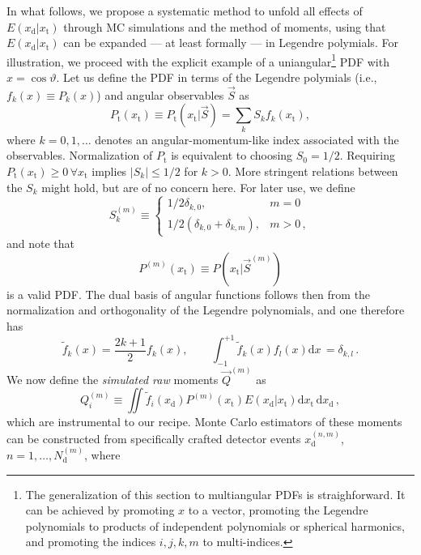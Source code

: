 \documentclass[aps,prd,reprint,nofootinbib,preprintnumbers]{revtex4}
\newcommand{\rmdx}[1]{\mbox{d} #1 \,} %
\newcommand{\subd}{_{\text{d}}}
\newcommand{\subt}{_{\text{t}}}
\renewcommand{\theta}{\vartheta}
\newcommand{\xd}{x\subd}
\newcommand{\xt}{x\subt}
\newcommand{\Ekernel}{E(\xd|\xt)}
\begin{document}
In what follows, we propose a systematic method to unfold all effects
of $\Ekernel$ through MC simulations and the method of moments,
using that $\Ekernel$ can be expanded --- at
least formally --- in Legendre polymials.  For illustration, we
proceed with the explicit example of a uniangular\footnote{%
  The generalization of this section to multiangular PDFs is
  straighforward. It can be achieved by promoting $x$ to a vector,
  promoting the Legendre polynomials to products of independent
  polynomials or spherical harmonics, and promoting the indices
  $i,j,k,m$ to multi-indices.  } PDF with $x = \cos\theta$. Let us
define the PDF in terms of the Legendre polymials (i.e., $f_k(x)
\equiv P_k(x)$) and angular observables $\vec{S}$ as
\begin{equation}
    P\subt(\xt) \equiv P\subt(\xt | \vec{S}) = \sum_k S_k f_k(\xt),
  \end{equation}
where $k = 0, 1, \dots$ denotes an angular-momentum-like index associated with the observables.
Normalization of $P\subt$ is equivalent to choosing $S_0 = 1/2$. Requiring $P\subt(\xt) \ge 0 \,\forall \xt$
implies $|S_k| \leq 1/2$ for $k > 0$. More stringent relations between the
$S_k$ might hold, but are of no concern here. For later use, we define
\begin{equation}
  \label{eq:def-Sk}
  S^{(m)}_k \equiv
  \begin{cases}
    1/2 \delta_{k,0}, & m=0\\
    1/2 (\delta_{k,0} + \delta_{k,m}), & m>0 \,,
  \end{cases}
\end{equation}
and note that
\begin{equation}
    P^{(m)}(\xt) \equiv P(\xt | \vec{S}^{(m)})
\end{equation}
is a valid PDF. The dual basis of angular functions follows then from the normalization
and orthogonality of the Legendre polynomials, and one therefore has
\begin{equation}
    \tilde{f}_k(x) = \frac{2 k + 1}{2} f_k(x),\qquad \int_{-1}^{+1} \tilde{f}_k(x) f_l(x) \rmdx{x} = \delta_{k,l}\,.
\end{equation}
We now define the \emph{simulated raw} moments $\vec{Q}^{(m)}$ as
\begin{equation}
    \label{eq:analytic-raw-moments}
    Q_i^{(m)} \equiv \iint \tilde{f}_i(\xd) P^{(m)}(\xt) \Ekernel \rmdx{\xt} \rmdx{\xd},
\end{equation}
which are instrumental to our recipe. Monte Carlo estimators of these moments can be constructed from specifically crafted detector events $x_\text{d}^{(n,m)}$, $n = 1, \dots, N_\text{d}^{(m)}$, where
\end{document}
